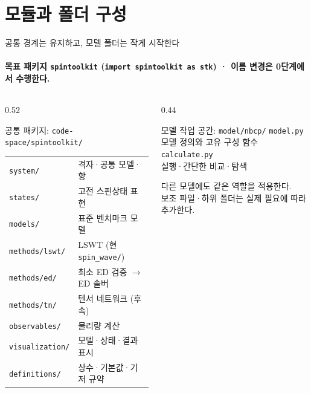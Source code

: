 \section[모듈과 폴더 구성]{모듈과 폴더 구성}

\begin{frame}[plain,label=section-modules]
  \sectionpage
\end{frame}

\begin{frame}[label=folder-plan]{공통 경계는 유지하고, 모델 폴더는 작게 시작한다}
  \framesubtitle{목표 패키지 \texttt{spintoolkit} (\texttt{import spintoolkit as stk}) · 이름 변경은 0단계에서 수행한다.}
  \begin{columns}[T,onlytextwidth]
    \begin{column}{0.52\textwidth}
      \begin{block}{공통 패키지: \texttt{code-space/spintoolkit/}}
        \small
        \begin{tabular}{@{}ll@{}}
          \texttt{system/} & 격자·공통 모델·항 \\
          \texttt{states/} & 고전 스핀상태 표현 \\
          \texttt{models/} & 표준 벤치마크 모델 \\
          \texttt{methods/lswt/} & LSWT (현 \texttt{spin\_wave/}) \\
          \texttt{methods/ed/} & 최소 ED 검증 $\to$ ED 솔버 \\
          \texttt{methods/tn/} & 텐서 네트워크 (후속) \\
          \texttt{observables/} & 물리량 계산 \\
          \texttt{visualization/} & 모델·상태·결과 표시 \\
          \texttt{definitions/} & 상수·기본값·기저 규약
        \end{tabular}
      \end{block}
    \end{column}
    \begin{column}{0.44\textwidth}
      \begin{block}{모델 작업 공간: \texttt{model/nbcp/}}
        \texttt{model.py}\\
        모델 정의와 고유 구성 함수\\[0.8em]
        \texttt{calculate.py}\\
        실행·간단한 비교·탐색
      \end{block}
      \smallskip
      다른 모델에도 같은 역할을 적용한다.\\
      보조 파일·하위 폴더는 실제 필요에 따라 추가한다.
    \end{column}
  \end{columns}
  \smallskip
\end{frame}


